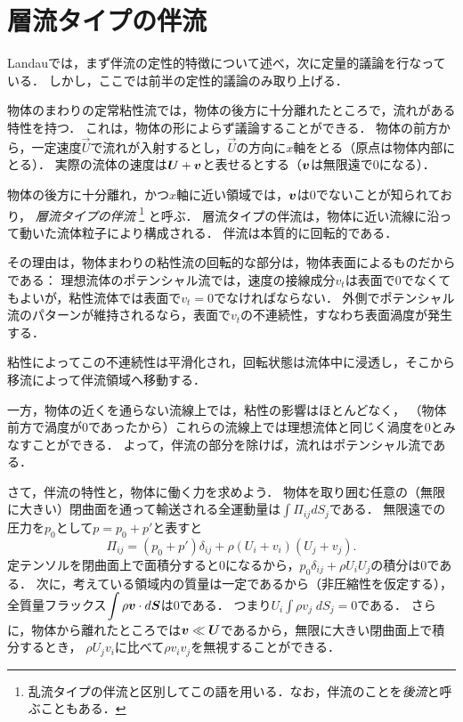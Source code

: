 \section{層流タイプの伴流}

\begin{details}
Landauでは，まず伴流の定性的特徴について述べ，次に定量的議論を行なっている．
しかし，ここでは前半の定性的議論のみ取り上げる．
\end{details}


物体のまわりの定常粘性流では，物体の後方に十分離れたところで，流れがある特性を持つ．
これは，物体の形によらず議論することができる．
物体の前方から，一定速度$\vec{U}$で流れが入射するとし，$\vec{U}$の方向に$x$軸をとる（原点は物体内部にとる）．
実際の流体の速度は$\vb*{U}+\vb*{v}$と表せるとする（$\vb*{v}$は無限遠で0になる）．


物体の後方に十分離れ，かつ$x$軸に近い領域では，$\vb*{v}$は0でないことが知られており，
\emph{層流タイプの伴流}
\footnote{乱流タイプの伴流と区別してこの語を用いる．なお，伴流のことを\emph{後流}と呼ぶこともある．}
と呼ぶ．
層流タイプの伴流は，物体に近い流線に沿って動いた流体粒子により構成される．
伴流は本質的に回転的である．
%
\begin{details}
\spade
その理由は，物体まわりの粘性流の回転的な部分は，物体表面によるものだからである：
理想流体のポテンシャル流では，速度の接線成分$v_t$は表面で0でなくてもよいが，粘性流体では表面で$v_t=0$でなければならない．
外側でポテンシャル流のパターンが維持されるなら，表面で$v_t$の不連続性，すなわち表面渦度が発生する．

粘性によってこの不連続性は平滑化され，回転状態は流体中に浸透し，そこから移流によって伴流領域へ移動する．
\end{details}
%
\noindent%
一方，物体の近くを通らない流線上では，粘性の影響はほとんどなく，
（物体前方で渦度が0であったから）これらの流線上では理想流体と同じく渦度を0とみなすことができる．
よって，伴流の部分を除けば，流れはポテンシャル流である．




さて，伴流の特性と，物体に働く力を求めよう．
物体を取り囲む任意の（無限に大きい）閉曲面を通って輸送される全運動量は$\displaystyle\int\varPi_{ij} dS_j$である．
無限遠での圧力を$p_0$として$p=p_0+p'$と表すと
\[
    \varPi_{ij} = (p_0+p')\delta_{ij} + \rho(U_i+v_i)(U_j+v_j).
\]
定テンソルを閉曲面上で面積分すると0になるから，$p_0\delta_{ij} + \rho U_iU_j$の積分は0である．
次に，考えている領域内の質量は一定であるから（非圧縮性を仮定する），全質量フラックス$\displaystyle \int \rho \vb*{v} \cdot d\vb*{S}$は0である．
つまり$\displaystyle U_i \int \rho v_j \; dS_j=0$である．
さらに，物体から離れたところでは$\vb*{v} \ll \vb*{U}$であるから，無限に大きい閉曲面上で積分するとき，
$\rho U_jv_i$に比べて$\rho v_iv_j$を無視することができる．

